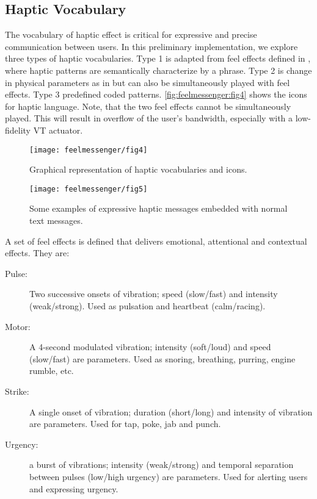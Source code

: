 \subsection{Haptic Vocabulary}
The vocabulary of haptic effect is critical for expressive and precise communication between users. In this preliminary implementation, we explore three types of haptic vocabularies. Type 1 is adapted from feel effects defined in \cite{Israr2014}, where haptic patterns are semantically characterize by a phrase. Type 2 is change in physical parameters as in \cite{Brewster2004,MacLean2003} but can also be simultaneously played with feel effects. Type 3 predefined coded patterns.
\autoref{fig:feelmessenger:fig4} shows the icons for haptic language. Note, that the two feel effects cannot be simultaneously played. This will result in overflow of the user's bandwidth, especially with a low-fidelity VT actuator.


\begin{figure}[htbp] %
   \centering
   \texttt{[image: feelmessenger/fig4]} 
   \caption{Graphical representation of haptic vocabularies and icons.}
   \label{fig:feelmessenger:fig4}
\end{figure}


\begin{figure}[htbp] %
   \centering
   \texttt{[image: feelmessenger/fig5]} 
   \caption{Some examples of expressive haptic messages embedded with normal text messages.}
   \label{fig:feelmessenger:fig5}
\end{figure}


A set of feel effects is defined that delivers emotional, attentional and contextual effects. They are:
\begin{description}
	\item[Pulse:] Two successive onsets of vibration; speed (slow/fast) and intensity (weak/strong). Used as pulsation and heartbeat (calm/racing).
	\item[Motor:] A 4-second modulated vibration; intensity (soft/loud) and speed (slow/fast) are parameters. Used as snoring, breathing, purring, engine rumble, etc.
	\item[Strike:] A single onset of vibration; duration (short/long) and intensity of vibration are parameters. Used for tap, poke, jab and punch.
	\item[Urgency:] a burst of vibrations; intensity (weak/strong) and temporal separation between pulses (low/high urgency) are parameters. Used for alerting users and expressing urgency.
\end{description}

